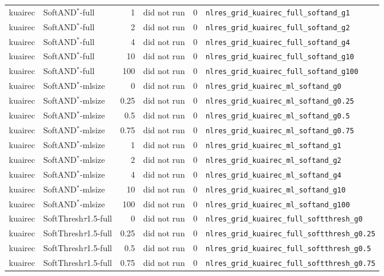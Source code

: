 \documentclass[10pt,a4paper]{article}
\begin{document}
{\begin{longtable}{llrrll}
kuairec & SoftAND$^*$-full & 1 & did not run & 0 & \texttt{nlres\_grid\_kuairec\_full\_softand\_g1} \\
kuairec & SoftAND$^*$-full & 2 & did not run & 0 & \texttt{nlres\_grid\_kuairec\_full\_softand\_g2} \\
kuairec & SoftAND$^*$-full & 4 & did not run & 0 & \texttt{nlres\_grid\_kuairec\_full\_softand\_g4} \\
kuairec & SoftAND$^*$-full & 10 & did not run & 0 & \texttt{nlres\_grid\_kuairec\_full\_softand\_g10} \\
kuairec & SoftAND$^*$-full & 100 & did not run & 0 & \texttt{nlres\_grid\_kuairec\_full\_softand\_g100} \\
kuairec & SoftAND$^*$-mlsize & 0 & did not run & 0 & \texttt{nlres\_grid\_kuairec\_ml\_softand\_g0} \\
kuairec & SoftAND$^*$-mlsize & 0.25 & did not run & 0 & \texttt{nlres\_grid\_kuairec\_ml\_softand\_g0.25} \\
kuairec & SoftAND$^*$-mlsize & 0.5 & did not run & 0 & \texttt{nlres\_grid\_kuairec\_ml\_softand\_g0.5} \\
kuairec & SoftAND$^*$-mlsize & 0.75 & did not run & 0 & \texttt{nlres\_grid\_kuairec\_ml\_softand\_g0.75} \\
kuairec & SoftAND$^*$-mlsize & 1 & did not run & 0 & \texttt{nlres\_grid\_kuairec\_ml\_softand\_g1} \\
kuairec & SoftAND$^*$-mlsize & 2 & did not run & 0 & \texttt{nlres\_grid\_kuairec\_ml\_softand\_g2} \\
kuairec & SoftAND$^*$-mlsize & 4 & did not run & 0 & \texttt{nlres\_grid\_kuairec\_ml\_softand\_g4} \\
kuairec & SoftAND$^*$-mlsize & 10 & did not run & 0 & \texttt{nlres\_grid\_kuairec\_ml\_softand\_g10} \\
kuairec & SoftAND$^*$-mlsize & 100 & did not run & 0 & \texttt{nlres\_grid\_kuairec\_ml\_softand\_g100} \\
kuairec & SoftThresh$\tau$1.5-full & 0 & did not run & 0 & \texttt{nlres\_grid\_kuairec\_full\_softthresh\_g0} \\
kuairec & SoftThresh$\tau$1.5-full & 0.25 & did not run & 0 & \texttt{nlres\_grid\_kuairec\_full\_softthresh\_g0.25} \\
kuairec & SoftThresh$\tau$1.5-full & 0.5 & did not run & 0 & \texttt{nlres\_grid\_kuairec\_full\_softthresh\_g0.5} \\
kuairec & SoftThresh$\tau$1.5-full & 0.75 & did not run & 0 & \texttt{nlres\_grid\_kuairec\_full\_softthresh\_g0.75} \\

\end{longtable}}
\end{document}
